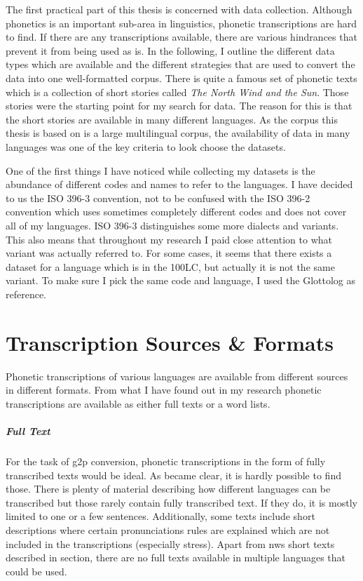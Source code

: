 \label{chap:data_collection}
The first practical part of this thesis is concerned with data collection. Although phonetics is an important sub-area in linguistics, phonetic transcriptions are hard to find. If there are any transcriptions available, there are various hindrances that prevent it from being used as is. In the following, I outline the different data types which are available and the different strategies that are used to convert the data into one well-formatted corpus. There is quite a famous set of phonetic texts which is a collection of short stories called \textit{The North Wind and the Sun}. Those stories were the starting point for my search for data. The reason for this is that the short stories are available in many different languages. As the corpus  this thesis is based on is a large multilingual corpus, the availability of data in many languages was one of the key criteria to look choose the datasets.

One of the first things I have noticed while collecting my datasets is the abundance of different codes and names to refer to the languages. I have decided to us the ISO 396-3 convention, not to be confused with the ISO 396-2 convention which uses sometimes completely different codes and does not cover all of my languages. ISO 396-3 distinguishes some more dialects and variants. This also means that throughout my research I paid close attention to what variant was actually referred to. For some cases, it seems that there exists a dataset for a language which is in the 100LC, but actually it is not the same variant. To make sure I pick the same code and language, I used the Glottolog as reference.


\section{Transcription Sources \& Formats}
Phonetic transcriptions of various languages are available from different sources in different formats. From what I have found out in my research phonetic transcriptions are available as either full texts or a word lists.

\subparagraph{Full Text}
For the task of \ac{g2p} conversion, phonetic transcriptions in the form of fully transcribed texts would be ideal. As became clear, it is hardly possible to find those. There is plenty of material describing how different languages can be transcribed but those rarely contain fully transcribed text. If they do, it is mostly limited to one or a few sentences. Additionally, some texts include short descriptions where certain pronunciations rules are explained which are not included in the transcriptions (especially stress). Apart from \ac{nws} short texts described in section, there are no full texts available in multiple languages that could be used.

